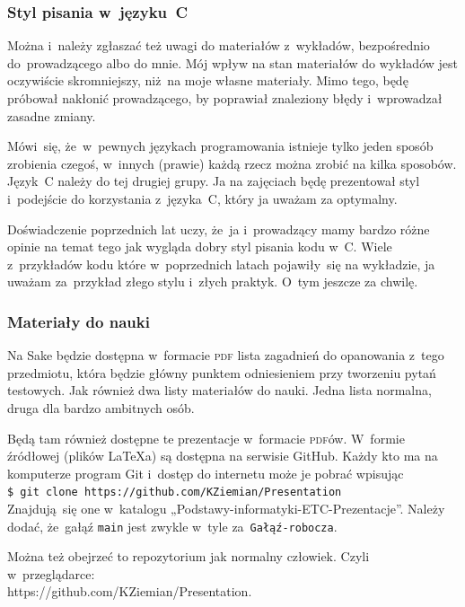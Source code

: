\documentclass[10pt,t]{beamer}
\begin{document}
\begin{frame}
  \frametitle{Styl pisania w~języku~C}


  Można i~należy zgłaszać też uwagi do materiałów z~wykładów, bezpośrednio
  do~prowadzącego albo do mnie. Mój wpływ na stan materiałów do wykładów
  jest oczywiście skromniejszy, niż~na moje własne materiały.
  Mimo tego, będę próbował nakłonić prowadzącego, by poprawiał znaleziony
  błędy i~wprowadzał zasadne zmiany.

  Mówi~się, że~w~pewnych językach programowania istnieje tylko jeden sposób
  zrobienia czegoś, w~innych (prawie) każdą rzecz można zrobić na kilka
  sposobów. Język~C należy do tej drugiej grupy. Ja na zajęciach będę
  prezentował styl i~podejście do korzystania z~języka~C, który ja uważam
  za optymalny.

  Doświadczenie poprzednich lat uczy, że~ja i~prowadzący mamy bardzo różne
  opinie na temat tego jak wygląda dobry styl pisania kodu w~C. Wiele
  z~przykładów kodu które w~poprzednich latach pojawiły~się na wykładzie,
  ja uważam za~przykład złego stylu i~złych praktyk. O~tym jeszcze za
  chwilę.

\end{frame}





\begin{frame}
  \frametitle{Materiały do nauki}


  Na Sake będzie dostępna w~formacie \textsc{pdf} \alert{lista zagadnień do
    opanowania z~tego przedmiotu}, która będzie główny punktem odniesieniem
  przy tworzeniu pytań testowych. Jak również dwa listy materiałów do nauki.
  Jedna lista normalna, druga dla bardzo ambitnych osób.

  Będą tam również dostępne te prezentacje w~formacie \textsc{pdf}ów.
  W~formie źródłowej (plików \LaTeX a) są dostępna na serwisie GitHub.
  Każdy kto ma na komputerze program Git i~dostęp do internetu może je
  pobrać wpisując \\
  \texttt{\$ git clone https://github.com/KZiemian/Presentation} \\
  Znajdują~się one w~katalogu „Podstawy-informatyki-ETC-Prezentacje”.
  Należy dodać, że~gałąź \texttt{main} jest zwykle w~tyle
  za~\texttt{Gałąź-robocza}.

  Można też obejrzeć to repozytorium jak normalny człowiek. Czyli
  w~przeglądarce: \\
  {https://github.com/KZiemian/Presentation}.

\end{frame}
\end{document}
